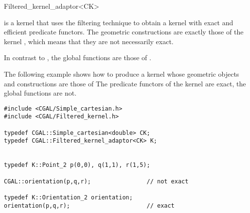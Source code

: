 \begin{ccRefClass}{Filtered_kernel_adaptor<CK>}

\KernelRefLayout\gdef\ccTagOperatorLayout{\ccFalse}

\ccDefinition

\ccClassTemplateName is a kernel that uses the filtering technique
\cite{cgal:bbp-iayed-01} to obtain a kernel with exact and efficient
predicate functors.
The geometric constructions are exactly those
of the kernel , which means that they are not necessarily exact.

In contrast to , 
the global functions are those of .



\ccExample

The following example shows how to produce a kernel whose geometric
objects and constructions are those of 
The predicate functors of the kernel are exact, the global functions
are not.

\begin{verbatim}
#include <CGAL/Simple_cartesian.h>
#include <CGAL/Filtered_kernel.h>

typedef CGAL::Simple_cartesian<double> CK;
typedef CGAL::Filtered_kernel_adaptor<CK> K;


typedef K::Point_2 p(0,0), q(1,1), r(1,5);

CGAL::orientation(p,q,r);                // not exact

typedef K::Orientation_2 orientation;
orientation(p,q,r);                      // exact

\end{verbatim}


\end{ccRefClass}
